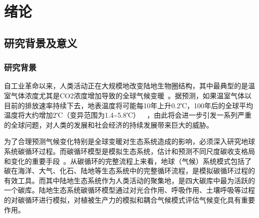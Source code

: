 \chapter{绪论}
\section{研究背景及意义}
\subsection{研究背景}

自工业革命以来，人类活动正在大规模地改变陆地生物圈结构，其中最典型的是温室气体浓度尤其是CO2浓度增加导致的全球气候变暖~\cite{houghton2001climate}。据预测，如果温室气体以目前的排放速率持续下去，地表温度将可能每10年上升0.2℃，100年后的全球平均温度将大约增加2℃（变异范围为1.4\textasciitilde5.8℃）~\cite{Oliver2013Intergovernmental}~\cite{宋燕燕2006陆地碳循环模型的比较分析}，由此将会进一步引发一系列严重的全球问题，对人类的发展和社会经济的持续发展带来巨大的威胁。

为了合理预测气候变化特别是全球变暖对生态系统造成的影响，必须深入研究地球系统碳循环过程。而碳循环模型是模拟生态系统，估计和预测不同尺度碳收支格局和变化的重要手段~\cite{cao2003interannual}。从碳循环的完整流程上来看，地球（气候）系统模式包括了碳在海洋、大气、化石、陆地等生态系统中的完整循环流程，是模拟碳循环过程的有效工具。而其中陆地生态系统作为人类活动的聚集地，是四大碳库中最为活跃的一个碳库。陆地生态系统碳循环模型通过对光合作用、呼吸作用、土壤呼吸等过程的对碳循环进行模拟，对植被生产力的模拟和耦合气候模式评估气候变化具有重要作用。


